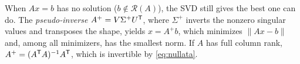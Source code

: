\documentclass[11pt]{article}
\begin{document}
\begin{remark}
When $Ax=b$ has no solution ($b\notin\mathcal R(A)$), the SVD still gives the best
one can do. The \emph{pseudo-inverse} $A^{+}=V\Sigma^{+}U^{\mathsf{T}}$, where $\Sigma^{+}$
inverts the nonzero singular values and transposes the shape, yields
$x=A^{+}b$, which minimizes $\|Ax-b\|$ and, among all minimizers, has the smallest
norm. If $A$ has full column rank, $A^{+}=(A^{\mathsf{T}} A)^{-1}A^{\mathsf{T}}$, which is invertible by
\eqref{eq:nullata}.
\end{remark}
\end{document}
